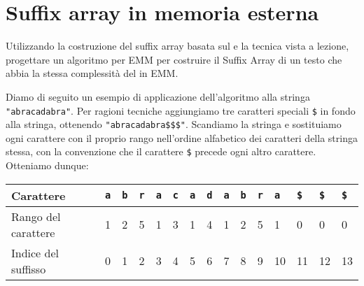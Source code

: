\chapter{Suffix array in memoria esterna}

\begin{problem*}
  Utilizzando la costruzione del suffix array basata sul \mergesort e la tecnica
  \dc vista a lezione, progettare un algoritmo per EMM per costruire il Suffix
  Array di un testo che abbia la stessa complessit\`a del \mergesort in EMM.
\end{problem*}

Diamo di seguito un esempio di applicazione dell'algoritmo \dc alla stringa
\texttt{\string"abracadabra\string"}. Per ragioni tecniche aggiungiamo tre 
caratteri speciali \texttt{\$} in fondo alla stringa, ottenendo 
\texttt{\string"abracadabra\$\$\$\string"}. Scandiamo la stringa e sostituiamo 
ogni carattere con il proprio rango nell'ordine alfabetico dei caratteri della 
stringa stessa, con la convenzione che il carattere \texttt{\$} precede ogni altro 
carattere. Otteniamo dunque:
\begin{table}[h]
  \begin{tabularx}{\linewidth}{l*{14}{X}}
    Carattere              & \texttt{a} & \texttt{b} & \texttt{r} & \texttt{a}
                           & \texttt{c} & \texttt{a} & \texttt{d} & \texttt{a}
                           & \texttt{b} & \texttt{r} & \texttt{a} & \texttt{\$}
                           & \texttt{\$} & \texttt{\$} \\
    \hline
    Rango del carattere    & 1 & 2 & 5 & 1 & 3 & 1 & 4 & 1 & 2 & 5 & 1 & 0 & 0 & 0 \\
    Indice del suffisso    & 0 & 1 & 2 & 3 & 4 & 5 & 6 & 7 & 8 & 9 & 10 & 11 & 12 & 13 \\
  \end{tabularx}
\end{table}

